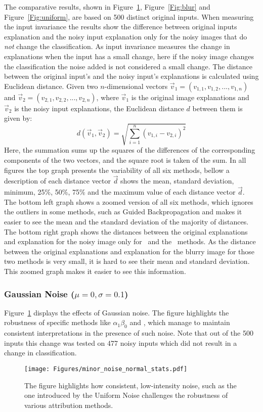 The comparative results, shown in Figure~\ref{Fig:norm}, Figure~\ref{Fig:blur} and Figure~\ref{Fig:uniform}, are based on 500 distinct original inputs. When measuring the input invariance the results show the difference between original inputs explanation and the noisy input explanation only for the noisy images that do \emph{not} change the classification. As input invariance measures the change in explanations when the input has a small change, here if the noisy image changes the classification the noise added is not considered a small change. The distance between the original input's and the noisy input's explanations is calculated using Euclidean distance. Given two $n$-dimensional vectors \( \vec{v}_1 = (v_{1,1}, v_{1,2}, ..., v_{1,n}) \) and \( \vec{v}_2 = (v_{2,1}, v_{2,2}, ..., v_{2,n}) \), where $\vec{v}_1$ is the original image explanations and $ \vec{v}_2$ is the noisy input explanations, the Euclidean distance \( d \) between them is given by:
\begin{equation*}
    d(\vec{v}_1, \vec{v}_2) = \sqrt{\sum_{i=1}^{n} (v_{1,i} - v_{2,i})^2}
\end{equation*}
Here, the summation sums up the squares of the differences of the corresponding components of the two vectors, and the square root is taken of the sum. In all figures the top graph presents the variability of all six methods, bellow a description of each distance vector $\vec{d}$ shows the mean, standard deviation, minimum, 25\%, 50\%, 75\% and the maximum value of each distance vector $\vec{d}$. The bottom left graph shows a zoomed version of all six methods, which ignores the outliers in some methods, such as Guided Backpropagation and makes it easier to see the mean and the standard deviation of the majority of distances. The bottom right graph shows the distances between the original explanations and explanation for the noisy image only for \LRP\ and the \CTC\ methods. As the distance between the original explanations and explanation for the blurry image for those two methods is very small, it is hard to see their mean and standard deviation. This zoomed graph makes it easier to see this information.  

\subsubsection{Gaussian Noise ($\mu = 0, \sigma = 0.1$)}
Figure~\ref{Fig:norm} displays the effects of Gaussian noise. The figure highlights the robustness of specific methods like \LRP\-$\alpha_1\beta_0$ and \CTC, which manage to maintain consistent interpretations in the presence of such noise. Note that out of the 500 inputs this change was tested on 477 noisy inputs which did not result in a change in classification. 
\begin{figure}[ht!]
	\begin{center}
		\texttt{[image: Figures/minor\_noise\_normal\_stats.pdf]}
	\end{center}
	\caption{The figure highlights how consistent, low-intensity noise, such as the one introduced by the Uniform Noise challenges the robustness of various attribution methods.}
	\label{Fig:norm}
\end{figure} 
